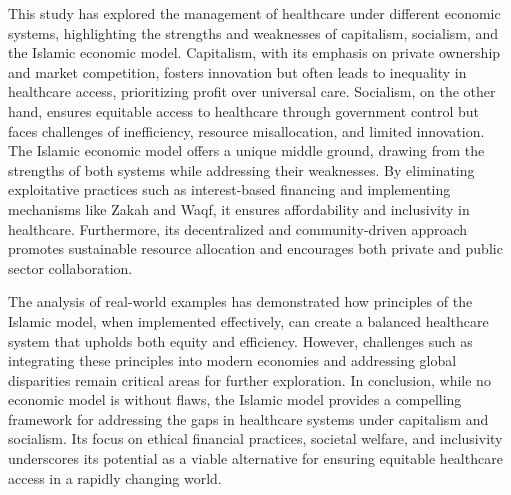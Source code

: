 \par
This study has explored the management of healthcare under different economic systems, highlighting the strengths and weaknesses of capitalism, socialism, and the Islamic economic model. Capitalism, with its emphasis on private ownership and market competition, fosters innovation but often leads to inequality in healthcare access, prioritizing profit over universal care. Socialism, on the other hand, ensures equitable access to healthcare through government control but faces challenges of inefficiency, resource misallocation, and limited innovation.
The Islamic economic model offers a unique middle ground, drawing from the strengths of both systems while addressing their weaknesses. By eliminating exploitative practices such as interest-based financing and implementing mechanisms like Zakah and Waqf, it ensures affordability and inclusivity in healthcare. Furthermore, its decentralized and community-driven approach promotes sustainable resource allocation and encourages both private and public sector collaboration.

\par
The analysis of real-world examples has demonstrated how principles of the Islamic model, when implemented effectively, can create a balanced healthcare system that upholds both equity and efficiency. However, challenges such as integrating these principles into modern economies and addressing global disparities remain critical areas for further exploration.
In conclusion, while no economic model is without flaws, the Islamic model provides a compelling framework for addressing the gaps in healthcare systems under capitalism and socialism. Its focus on ethical financial practices, societal welfare, and inclusivity underscores its potential as a viable alternative for ensuring equitable healthcare access in a rapidly changing world.